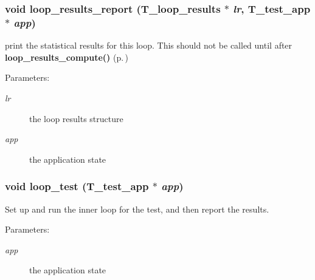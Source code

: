 \subsubsection{\setlength{\rightskip}{0pt plus 5cm}void loop\_\-results\_\-report ({\bf T\_\-loop\_\-results} $\ast$ {\em lr}, {\bf T\_\-test\_\-app} $\ast$ {\em app})}\label{group__loop__test_a19}


print the statistical results for this loop. This should not be called until after {\bf loop\_\-results\_\-compute()} {\rm (p.\,\pageref{group__loop__test_a7})}

\begin{Desc}
\item[Parameters: ]\par
\begin{description}
\item[{\em 
lr}]the loop results structure \item[{\em 
app}]the application state \end{description}
\end{Desc}
\subsubsection{\setlength{\rightskip}{0pt plus 5cm}void loop\_\-test ({\bf T\_\-test\_\-app} $\ast$ {\em app})}\label{group__loop__test_a20}


Set up and run the inner loop for the test, and then report the results.

\begin{Desc}
\item[Parameters: ]\par
\begin{description}
\item[{\em 
app}]the application state \end{description}
\end{Desc}

